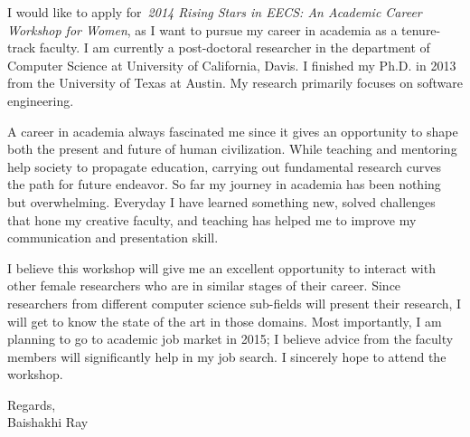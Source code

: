 \documentclass[10pt,stdletter,dateno,sigleft]{newlfm} %
\begin{document}
\begin{newlfm}

I would like to apply for~\textit{2014 Rising Stars in EECS: An Academic Career Workshop for Women}, as I want to pursue my career in academia as a tenure-track faculty. I am currently a post-doctoral researcher in the department of Computer Science at University of California, Davis. I finished my Ph.D. in 2013 from the University of Texas at Austin. My research primarily focuses on software engineering.
	
A career in academia always fascinated me since it gives an opportunity to shape both the present and future of human civilization. While teaching and mentoring help society to propagate education, carrying out fundamental research curves the path for future endeavor. So far my journey in academia 
has been nothing but overwhelming.  Everyday I have learned something new, solved challenges that hone my creative faculty, and teaching has helped me to improve my communication and presentation skill.

I believe this workshop will give me an excellent opportunity to interact with other female researchers who are in similar stages of their career. Since researchers from different computer science sub-fields will present their research, I will get to know the state of the art in those domains. Most importantly, I am planning to go to academic job market in 2015; I believe advice from the faculty members will significantly help in my job search.
I sincerely hope to attend the workshop.

Regards, \\
Baishakhi Ray
\end{newlfm}
\end{document}
